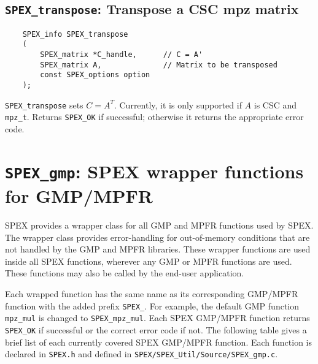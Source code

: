 \documentclass[12pt,oneside]{book}
\theoremstyle{definition}
\begin{document}


\subsection{\texttt{SPEX\_transpose}: Transpose a CSC mpz matrix}
\begin{mdframed}[userdefinedwidth=\textwidth]
{\footnotesize
\begin{verbatim}
    SPEX_info SPEX_transpose
    (
        SPEX_matrix *C_handle,      // C = A'
        SPEX_matrix A,              // Matrix to be transposed
        const SPEX_options option
    ); 
\end{verbatim}
} \end{mdframed}

\verb|SPEX_transpose| sets $C = A^T$. Currently, it is only supported if $A$ is CSC and \verb|mpz_t|. Returns \verb|SPEX_OK| if successful; otherwise it returns the appropriate error code.


\newpage
\section{\texttt{SPEX\_gmp}: SPEX wrapper functions for GMP/MPFR}
SPEX provides a wrapper class for all GMP and MPFR functions used by SPEX.
The wrapper class provides error-handling for out-of-memory conditions
that are not handled by the GMP and MPFR libraries.  These wrapper functions
are used inside all SPEX functions, wherever any GMP or MPFR functions are
used.  These functions may also be called by the end-user application. 

Each wrapped function has the same name as its corresponding GMP/MPFR function
with the added prefix \verb|SPEX_|. For example, the default GMP function
\verb|mpz_mul| is changed to \verb|SPEX_mpz_mul|. Each SPEX GMP/MPFR function
returns \verb|SPEX_OK| if successful or the correct error code if not. The
following table gives a brief list of each currently covered SPEX GMP/MPFR
function. Each function is declared in \verb|SPEX.h| and defined in
\verb|SPEX/SPEX_Util/Source/SPEX_gmp.c|.
\end{document}
